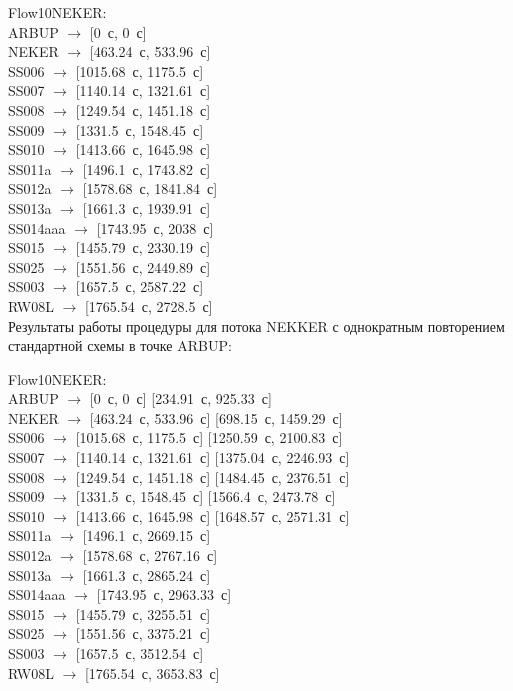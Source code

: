 \documentclass[12pt]{article}
\theoremstyle{plain}
\begin{document}
\noindent Flow10NEKER:\\
ARBUP $\rightarrow$ [0~с, 0~с]\\
NEKER $\rightarrow$ [463.24~с, 533.96~с]\\
SS006 $\rightarrow$ [1015.68~с, 1175.5~с]\\
SS007 $\rightarrow$ [1140.14~с, 1321.61~с]\\
SS008 $\rightarrow$ [1249.54~с, 1451.18~с]\\
SS009 $\rightarrow$ [1331.5~с, 1548.45~с]\\
SS010 $\rightarrow$ [1413.66~с, 1645.98~с]\\
SS011a $\rightarrow$ [1496.1~с, 1743.82~с]\\
SS012a $\rightarrow$ [1578.68~с, 1841.84~с]\\
SS013a $\rightarrow$ [1661.3~с, 1939.91~с]\\
SS014aaa $\rightarrow$ [1743.95~с, 2038~с]\\
SS015 $\rightarrow$ [1455.79~с, 2330.19~с]\\
SS025 $\rightarrow$ [1551.56~с, 2449.89~с]\\
SS003 $\rightarrow$ [1657.5~с, 2587.22~с]\\
RW08L $\rightarrow$ [1765.54~с, 2728.5~с]\\



Результаты работы процедуры для потока NEKKER с однократным повторением стандартной схемы в точке ARBUP:

\noindent Flow10NEKER:\\
ARBUP $\rightarrow$ [0~с, 0~с] [234.91~с, 925.33~с]\\
NEKER $\rightarrow$ [463.24~с, 533.96~с] [698.15~с, 1459.29~с]\\
SS006 $\rightarrow$ [1015.68~с, 1175.5~с] [1250.59~с, 2100.83~с]\\
SS007 $\rightarrow$ [1140.14~с, 1321.61~с] [1375.04~с, 2246.93~с]\\
SS008 $\rightarrow$ [1249.54~с, 1451.18~с] [1484.45~с, 2376.51~с]\\
SS009 $\rightarrow$ [1331.5~с, 1548.45~с] [1566.4~с, 2473.78~с]\\
SS010 $\rightarrow$ [1413.66~с, 1645.98~с] [1648.57~с, 2571.31~с]\\
SS011a $\rightarrow$ [1496.1~с, 2669.15~с]\\
SS012a $\rightarrow$ [1578.68~с, 2767.16~с]\\
SS013a $\rightarrow$ [1661.3~с, 2865.24~с]\\
SS014aaa $\rightarrow$ [1743.95~с, 2963.33~с]\\
SS015 $\rightarrow$ [1455.79~с, 3255.51~с]\\
SS025 $\rightarrow$ [1551.56~с, 3375.21~с]\\
SS003 $\rightarrow$ [1657.5~с, 3512.54~с]\\
RW08L $\rightarrow$ [1765.54~с, 3653.83~с]\\
\end{document}
